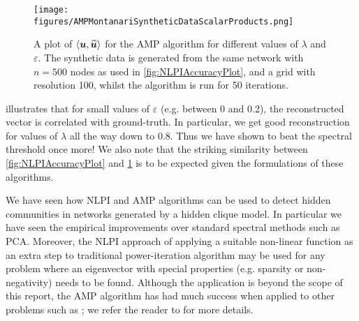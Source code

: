 
\begin{figure}
	\centering
	\texttt{[image: figures/AMPMontanariSyntheticDataScalarProducts.png]}
	\caption[Plot of accuracy for AMP algorithm.]{\label{fig:AMPAccuracyPlot} A plot of $\innerP{\vecvar{u},\widehat{\vecvar{u}}}$ for the AMP algorithm for different values of $\lambda$ and $\varepsilon$. The synthetic data is generated from the same network with $n=500$ nodes as used in \cref{fig:NLPIAccuracyPlot}, and a grid with resolution 100, whilst the algorithm is run for 50 iterations.}
\end{figure}

 illustrates that for small values of $\varepsilon$ (e.g. between 0 and 0.2), the reconstructed vector is correlated with ground-truth.
In particular, we get good reconstruction for values of $\lambda$ all the way down to 0.8. Thus we have shown to beat the spectral threshold once more!
We also note that the striking similarity between \cref{fig:NLPIAccuracyPlot} and \cref{fig:AMPAccuracyPlot} is to be expected given the formulations of these algorithms.

We have seen how NLPI and AMP algorithms can be used to detect hidden communities in networks generated by a hidden clique model.
In particular we have seen the empirical improvements over standard spectral methods such as PCA.
Moreover, the NLPI approach of applying a suitable non-linear function as an extra step to traditional power-iteration algorithm may be used for any problem where an eigenvector with special properties (e.g. sparsity or non-negativity) needs to be found.
Although the application is beyond the scope of this report, the AMP algorithm has had much success when applied to other problems such as ; we refer the reader to \cite{DMM09,MDM10,BM11,Mon11,BKS13} for more details. 